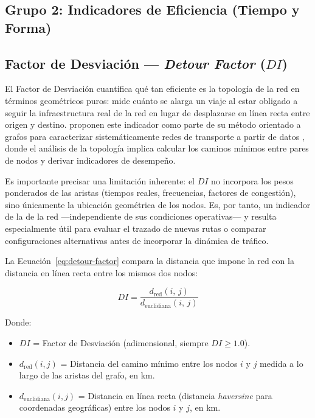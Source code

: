 
\subsection*{Grupo 2: Indicadores de Eficiencia (Tiempo y Forma)}

\subsection{Factor de Desviación --- \texorpdfstring{\textit{Detour Factor} ($DI$)}{Detour Factor (DI)}}
\label{subsec:ruta-directa}

El Factor de Desviación cuantifica qué tan eficiente es la topología de la red
en términos geométricos puros: mide cuánto se alarga un viaje al estar obligado
a seguir la infraestructura real de la red en lugar de desplazarse en línea
recta entre origen y destino. \citet{fortin2016innovative} proponen este
indicador como parte de su método orientado a grafos para caracterizar
sistemáticamente redes de transporte a partir de datos \gtfs{}, donde el
análisis de la topología implica calcular los caminos mínimos entre pares de
nodos y derivar indicadores de desempeño.

Es importante precisar una limitación inherente: el $DI$ no incorpora los pesos
ponderados de las aristas (tiempos reales, frecuencias, factores de congestión),
sino únicamente la ubicación geométrica de los nodos. Es, por tanto, un
indicador de la  de la red ---independiente de
sus condiciones operativas--- y resulta especialmente útil para evaluar el
trazado de nuevas rutas o comparar configuraciones alternativas antes de
incorporar la dinámica de tráfico.

La Ecuación~\eqref{eq:detour-factor} compara la distancia que impone la red con
la distancia en línea recta entre los mismos dos nodos:

\begin{equation}
    DI = \frac{d_{\text{red}}(i,\, j)}{d_{\text{euclidiana}}(i,\, j)}
    \label{eq:detour-factor}
\end{equation}

Donde:
\begin{itemize}
    \item $DI$ = Factor de Desviación (adimensional, siempre $DI \geq 1.0$).
\item $d_{\text{red}}(i, j)$ = Distancia del camino mínimo entre los nodos $i$
    y $j$ medida a lo largo de las aristas del grafo, en km.
    \item $d_{\text{euclidiana}}(i, j)$ = Distancia en línea recta (distancia
    \textit{haversine} para coordenadas geográficas) entre los nodos $i$ y $j$,
    en km.
\end{itemize}

